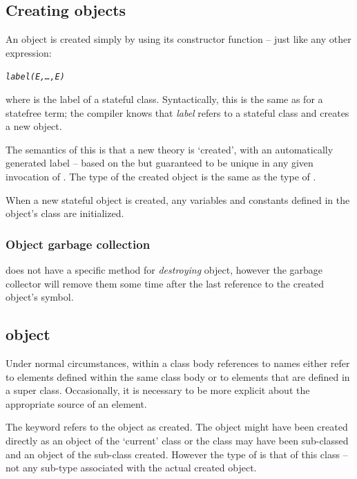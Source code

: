 \subsection{Creating objects}
\label{objects:create}

An object is created simply by using its constructor function -- just like any other expression:
\begin{alltt}
\emph{label(E,\ldots{},E\subn)}
\end{alltt}
where  is the label of a stateful class. Syntactically, this is the same as for a statefree term; the compiler knows that \emph{label} refers to a stateful class and creates a new object.

The semantics of this is that a new theory is `created', with an automatically generated label -- based on the  but guaranteed to be unique in any given invocation of \go. The type of the created object is the same as the type of .

When a new stateful object is created, any variables and constants defined in the object's class are initialized.


\subsubsection{Object garbage collection}
\go does not have a specific method for \emph{destroying} object, however the garbage collector will remove them some time after the last reference to the created object's symbol.

\subsection{ object}
\label{objects:this}

Under normal circumstances, within a class body references to names either refer to elements defined within the same class body or to elements that are defined in a super class. Occasionally, it is necessary to be more explicit about the appropriate source of an element.

The  keyword refers to the object as created. The object might have been created directly as an object of the `current' class or the class may have been sub-classed and an object of the sub-class created. However the type of  is that of this class -- not any sub-type associated with the actual created object.

